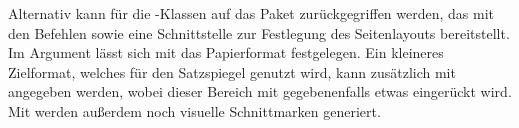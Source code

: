 \documentclass[english,ngerman,ttfont=roboto,ToDo=inline,final]{tudscrmanual}
\begin{document}
\makeatletter


%
%
%
%
%

\noindent
Alternativ kann für die \TUDScript-Klassen auf das Paket 
zurückgegriffen werden, das mit den Befehlen  sowie 
 eine Schnittstelle zur Festlegung des Seitenlayouts 
bereitstellt. Im Argument lässt sich mit 
das Papierformat festgelegen. Ein kleineres Zielformat, welches für den 
Satzspiegel genutzt wird, kann zusätzlich mit  
angegeben werden, wobei dieser Bereich mit  
gegebenenfalls etwas eingerückt wird. Mit  werden 
außerdem noch visuelle Schnittmarken generiert.
\end{document}
